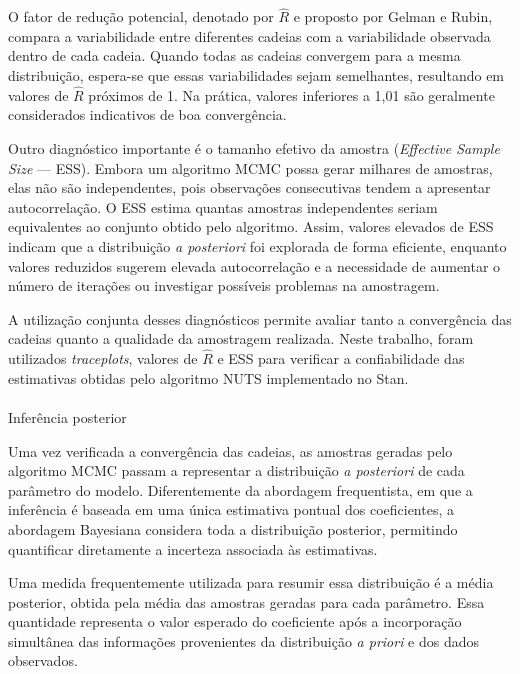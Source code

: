 \documentclass[
  brazilian,
  12pt,
  letterpaper,
  DIV=11,
  numbers=noendperiod]{scrartcl}
\makeatletter
\let\oldparagraph\paragraph
\renewcommand{\paragraph}{
    \@ifstar
      \xxxParagraphStar
      \xxxParagraphNoStar
  }
\newcommand{\xxxParagraphStar}[1]{\oldparagraph*{#1}\mbox{}}
\newcommand{\xxxParagraphNoStar}[1]{\oldparagraph{#1}\mbox{}}
\makeatother
\begin{document}
O fator de redução potencial, denotado por \(\hat{R}\) e proposto por
Gelman e Rubin, compara a variabilidade entre diferentes cadeias com a
variabilidade observada dentro de cada cadeia. Quando todas as cadeias
convergem para a mesma distribuição, espera-se que essas variabilidades
sejam semelhantes, resultando em valores de \(\hat{R}\) próximos de 1.
Na prática, valores inferiores a 1,01 são geralmente considerados
indicativos de boa convergência.

Outro diagnóstico importante é o tamanho efetivo da amostra
(\emph{Effective Sample Size} --- ESS). Embora um algoritmo MCMC possa
gerar milhares de amostras, elas não são independentes, pois observações
consecutivas tendem a apresentar autocorrelação. O ESS estima quantas
amostras independentes seriam equivalentes ao conjunto obtido pelo
algoritmo. Assim, valores elevados de ESS indicam que a distribuição
\emph{a posteriori} foi explorada de forma eficiente, enquanto valores
reduzidos sugerem elevada autocorrelação e a necessidade de aumentar o
número de iterações ou investigar possíveis problemas na amostragem.

A utilização conjunta desses diagnósticos permite avaliar tanto a
convergência das cadeias quanto a qualidade da amostragem realizada.
Neste trabalho, foram utilizados \emph{traceplots}, valores de
\(\hat{R}\) e ESS para verificar a confiabilidade das estimativas
obtidas pelo algoritmo NUTS implementado no Stan.

\paragraph{Inferência posterior}\label{inferuxeancia-posterior}

Uma vez verificada a convergência das cadeias, as amostras geradas pelo
algoritmo MCMC passam a representar a distribuição \emph{a posteriori}
de cada parâmetro do modelo. Diferentemente da abordagem frequentista,
em que a inferência é baseada em uma única estimativa pontual dos
coeficientes, a abordagem Bayesiana considera toda a distribuição
posterior, permitindo quantificar diretamente a incerteza associada às
estimativas.

Uma medida frequentemente utilizada para resumir essa distribuição é a
média posterior, obtida pela média das amostras geradas para cada
parâmetro. Essa quantidade representa o valor esperado do coeficiente
após a incorporação simultânea das informações provenientes da
distribuição \emph{a priori} e dos dados observados.
\end{document}

